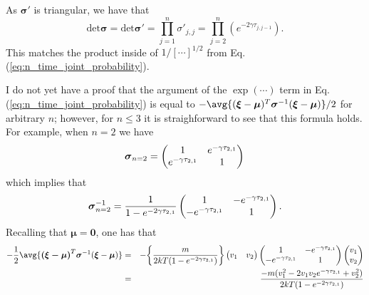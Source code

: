 As $\boldsymbol{\sigma}'$ is triangular, we have that
\begin{equation}
\text{det} \boldsymbol{\sigma} = \text{det} \boldsymbol{\sigma}' =   \prod_{j=1}^{n} \sigma'_{j,j} = \prod_{j=2}^{n} (e^{-2\gamma	\tau_{j,j-1}}).
\end{equation}
This matches the product inside of $1/[\cdots]^{1/2}$ from Eq. (\ref{eq:n_time_joint_probability}). 

I do not yet have a proof that the argument of the $\exp(\cdots)$ term in Eq. (\ref{eq:n_time_joint_probability}) is equal to $- \avg{(\boldsymbol{\xi} - \boldsymbol{\mu})^{T} \boldsymbol{\sigma}^{-1} (\boldsymbol{\xi} - \boldsymbol{\mu})}/2$ for arbitrary $n$; however, for $n\leq 3$ it is straighforward to see that this formula holds. For example, when $n=2$ we have
\begin{equation}
\boldsymbol{\sigma}_{n=2} = \begin{pmatrix}
 1 & e^{-\gamma	\tau_{2,1}} \\
e^{-\gamma	\tau_{2,1}} & 1 \\
\end{pmatrix} \\
\end{equation}
which implies that
\begin{equation}
\boldsymbol{\sigma}_{n=2}^{-1} = \frac{1}{1-e^{-2\gamma	\tau_{2,1}}} \begin{pmatrix}
 1 & -e^{-\gamma	\tau_{2,1}} \\
-e^{-\gamma	\tau_{2,1}} & 1 \\
\end{pmatrix}. \\
\end{equation}
Recalling that $\boldsymbol{\mu} = \boldsymbol{0}$, one has that
\begin{eqnarray}
-\frac{1}{2}\avg{\boldsymbol{(\xi-\boldsymbol{\mu})}^{T} \boldsymbol{\sigma}^{-1} (\boldsymbol{\xi}-\boldsymbol{\mu})} &=&  -\bigg\{\frac{m}{2kT(1-e^{-2\gamma	\tau_{2,1}})}\bigg\} \begin{pmatrix}
 v_1 & v_2 \\
\end{pmatrix}\begin{pmatrix}
 1 & -e^{-\gamma	\tau_{2,1}} \\
-e^{-\gamma	\tau_{2,1}} & 1 \\
\end{pmatrix} \begin{pmatrix}
 v_1 \\
 v_2 \\
\end{pmatrix} \nonumber \\
&=& \frac{-m(v_1 ^ 2 -2v_1 v_2 e^{-\gamma	\tau_{2,1}} + v_2 ^2)}{2 kT(1-e^{-2\gamma	\tau_{2,1}})}
\end{eqnarray}
